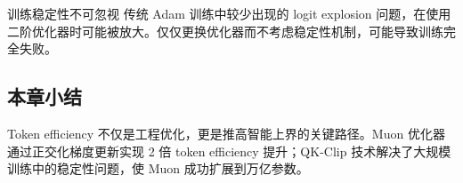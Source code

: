 \begin{warningbox}{训练稳定性不可忽视}
传统 Adam 训练中较少出现的 logit explosion 问题，在使用二阶优化器时可能被放大。仅仅更换优化器而不考虑稳定性机制，可能导致训练完全失败。
\end{warningbox}

\subsection{本章小结}

Token efficiency 不仅是工程优化，更是推高智能上界的关键路径。Muon 优化器通过正交化梯度更新实现 2 倍 token efficiency 提升；QK-Clip 技术解决了大规模训练中的稳定性问题，使 Muon 成功扩展到万亿参数。


